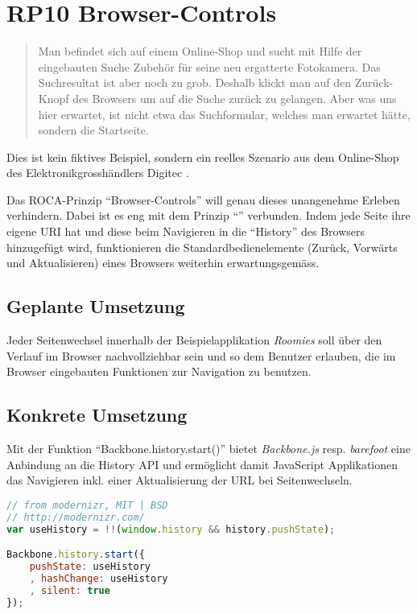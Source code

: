 \section{RP10 Browser-Controls}
\label{sec:principle-rp10-browser-controls}

\begin{quotation}
Man befindet sich auf einem Online-Shop und sucht mit Hilfe der eingebauten Suche Zubehör für seine neu ergatterte Fotokamera. Das Suchresultat ist aber noch zu grob. Deshalb klickt man auf den Zurück-Knopf des Browsers um auf die Suche zurück zu gelangen. Aber was uns hier erwartet, ist nicht etwa das Suchformular, welches man erwartet hätte, sondern die Startseite.
\end{quotation}
Dies ist kein fiktives Beispiel, sondern ein reelles Szenario aus dem Online-Shop des Elektronikgrosshändlers Digitec \cite{Digitec}.

Das ROCA-Prinzip ``Browser-Controls'' will genau dieses unangenehme Erleben verhindern. Dabei ist es eng mit dem Prinzip ``'' verbunden. Indem jede Seite ihre eigene \gls{URI} hat und diese beim Navigieren in die ``History'' des Browsers hinzugefügt wird, funktionieren die Standardbedienelemente (Zurück, Vorwärts und Aktualisieren) eines Browsers weiterhin erwartungsgemäss.


\subsection*{Geplante Umsetzung}

Jeder Seitenwechsel innerhalb der Beispielapplikation \emph{Roomies} soll über den Verlauf im Browser nachvollziehbar sein und so dem Benutzer erlauben, die im Browser eingebauten Funktionen zur Navigation zu benutzen.

\subsection*{Konkrete Umsetzung}

Mit der Funktion ``Backbone.history.start()'' \cite{BackbonejsHistory} bietet \emph{Backbone.js} resp. \emph{barefoot} eine Anbindung an die History API \cite{HistoryAPI} und ermöglicht damit JavaScript Applikationen das Navigieren inkl. einer Aktualisierung der URL bei Seitenwechseln.

\begin{lstlisting}[language=JavaScript, caption={Aktivierung der History in Barefoot \cite{BarefootStartClient}}, label=lst:barefootStartClientHistory, firstnumber=29]
// from modernizr, MIT | BSD
// http://modernizr.com/
var useHistory = !!(window.history && history.pushState);

Backbone.history.start({
	pushState: useHistory
	, hashChange: useHistory
	, silent: true
});
\end{lstlisting}

